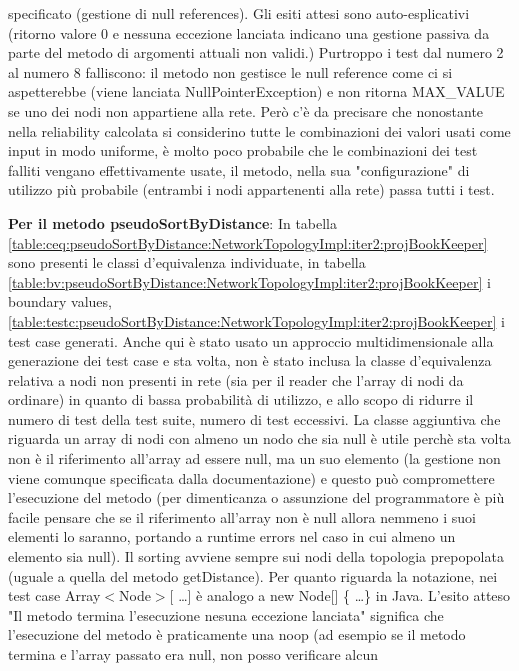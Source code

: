 \documentclass[10pt, a4paper]{article}
\newcommand{\gettablelabel}[5]{table:#1:#2:#3:iter#4:proj#5}
\def\bookkeeper{BookKeeper}
\begin{document}
	specificato (gestione di null references).
	Gli esiti attesi sono auto-esplicativi (ritorno valore 0 e nessuna eccezione
	lanciata indicano una gestione passiva da parte del metodo di argomenti attuali non validi.)
	Purtroppo i test dal numero 2 al numero 8 falliscono: il metodo non gestisce
	le null reference come ci si aspetterebbe (viene lanciata
	NullPointerException) e non ritorna MAX\_VALUE se uno dei nodi non appartiene
	alla rete. Però c'è da precisare che nonostante nella reliability calcolata
	si considerino tutte le combinazioni dei valori usati come input in modo
	uniforme, è molto poco probabile che le combinazioni dei test falliti vengano
	effettivamente usate, il metodo, nella sua "configurazione" di utilizzo più
	probabile (entrambi i nodi appartenenti alla rete) passa tutti i test.
	
	\textbf{Per il metodo pseudoSortByDistance}: In tabella 
	\ref{\gettablelabel{ceq}{pseudoSortByDistance}{NetworkTopologyImpl}{2}{\bookkeeper}}
	sono presenti le classi d'equivalenza individuate, in tabella 
	\ref{\gettablelabel{bv}{pseudoSortByDistance}{NetworkTopologyImpl}{2}{\bookkeeper}}
	i boundary values, 
	\ref{\gettablelabel{testc}{pseudoSortByDistance}{NetworkTopologyImpl}{2}{\bookkeeper}}
	i test case generati.
	Anche qui è stato usato un approccio multidimensionale alla generazione dei
	test case e sta volta, non è stato inclusa la classe d'equivalenza relativa
	a nodi non presenti in rete (sia per il reader che l'array di nodi da
	ordinare) in quanto di bassa probabilità di utilizzo, e allo scopo di ridurre
	il numero di test della test suite, numero di test eccessivi.
	La classe aggiuntiva che riguarda un array di nodi con almeno un nodo che sia
	null è utile perchè sta volta non è il riferimento all'array ad essere null,
	ma un suo elemento (la gestione non viene comunque specificata dalla
	documentazione) e questo può compromettere l'esecuzione del metodo (per
	dimenticanza o assunzione del programmatore è più facile pensare che se
	il riferimento all'array non è null allora nemmeno i suoi elementi lo saranno,
	portando a runtime errors nel caso in cui almeno un elemento sia null).
	Il sorting avviene sempre sui nodi della topologia prepopolata (uguale a quella
	del metodo getDistance). Per quanto riguarda la notazione, nei test case
	Array$<$Node$>$[ \dots ] è analogo a new Node[] \{ \dots \} in Java.
	L'esito atteso "Il metodo termina l'esecuzione nesuna eccezione lanciata"
	significa che l'esecuzione del metodo è praticamente una noop (ad esempio
	se il metodo termina e l'array passato era null, non posso verificare alcun
\end{document}

